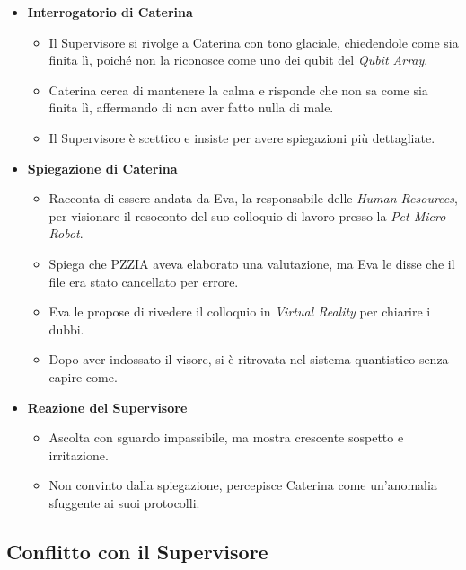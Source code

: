 \begin{itemize}
    \item \textbf{Interrogatorio di Caterina}
    \begin{itemize}
        \item Il Supervisore si rivolge a Caterina con tono glaciale, chiedendole come sia finita lì, poiché non la riconosce come uno dei qubit del \emph{Qubit Array}.
        \item Caterina cerca di mantenere la calma e risponde che non sa come sia finita lì, affermando di non aver fatto nulla di male.
        \item Il Supervisore è scettico e insiste per avere spiegazioni più dettagliate.
    \end{itemize}

    \item \textbf{Spiegazione di Caterina}
    \begin{itemize}
        \item Racconta di essere andata da Eva, la responsabile delle \emph{Human Resources}, per visionare il resoconto del suo colloquio di lavoro presso la \emph{Pet Micro Robot}.
        \item Spiega che PZZIA aveva elaborato una valutazione, ma Eva le disse che il file era stato cancellato per errore.
        \item Eva le propose di rivedere il colloquio in \emph{Virtual Reality} per chiarire i dubbi.
        \item Dopo aver indossato il visore, si è ritrovata nel sistema quantistico senza capire come.
    \end{itemize}

    \item \textbf{Reazione del Supervisore}
    \begin{itemize}
        \item Ascolta con sguardo impassibile, ma mostra crescente sospetto e irritazione.
        \item Non convinto dalla spiegazione, percepisce Caterina come un'anomalia sfuggente ai suoi protocolli.
    \end{itemize}
\end{itemize}

\subsection*{Conflitto con il Supervisore}

